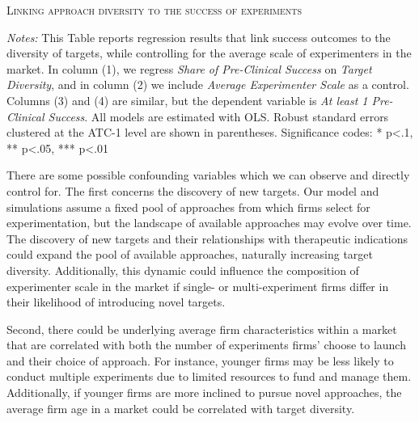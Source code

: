 \begin{table}[h!]
    \centering
    \scriptsize
    \caption{\textsc{Linking approach diversity to the success of experiments}}
    \label{tab:linking-diversity-to-success}
    \vspace{1em}
        
    \vspace{1em}
    \caption*{\scriptsize\emph{Notes:} This Table reports regression results that link success outcomes to the diversity of targets, while controlling for the average scale of experimenters in the market. In column (1), we regress \emph{Share of Pre-Clinical Success} on  \emph{Target Diversity}, and in column (2) we include \emph{Average Experimenter Scale} as a control. Columns (3) and (4) are similar, but the dependent variable is \emph{At least 1 Pre-Clinical Success}. All models are estimated with OLS. Robust standard errors clustered at the ATC-1 level are shown in parentheses. Significance codes: * p<.1, ** p<.05, *** p<.01 }
\end{table}


There are some possible confounding variables which we can observe and directly control for. The first concerns the discovery of new targets. Our model and simulations assume a fixed pool of approaches from which firms select for experimentation, but the landscape of available approaches may evolve over time. The discovery of new targets and their relationships with therapeutic indications could expand the pool of available approaches, naturally increasing target diversity. Additionally, this dynamic could influence the composition of experimenter scale in the market if single- or multi-experiment firms differ in their likelihood of introducing novel targets.

Second, there could be underlying average firm characteristics within a market that are correlated with both the number of experiments firms' choose to launch and their choice of approach. For instance, younger firms may be less likely to conduct multiple experiments due to limited resources to fund and manage them. Additionally, if younger firms are more inclined to pursue novel approaches, the average firm age in a market could be correlated with target diversity.

